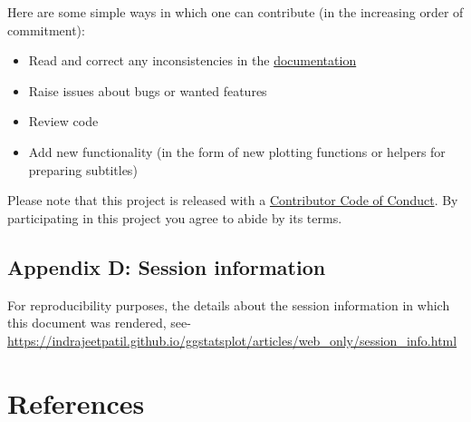\documentclass[
]{article}
\begin{document}
Here are some simple ways in which one can contribute (in the increasing order
of commitment):

\begin{itemize}
\item
  Read and correct any inconsistencies in the
  \href{https://indrajeetpatil.github.io/ggstatsplot/}{documentation}
\item
  Raise issues about bugs or wanted features
\item
  Review code
\item
  Add new functionality (in the form of new plotting functions or helpers for
  preparing subtitles)
\end{itemize}

Please note that this project is released with a
\href{https://github.com/IndrajeetPatil/ggstatsplot/blob/master/CODE_OF_CONDUCT.md}{Contributor Code of Conduct}. By participating in this project you agree to abide by its terms.

\hypertarget{appendix-d-session-information}{%
\subsection{Appendix D: Session information}\label{appendix-d-session-information}}

For reproducibility purposes, the details about the session information in which
this document was rendered, see-
\url{https://indrajeetpatil.github.io/ggstatsplot/articles/web_only/session_info.html}

\newpage

\hypertarget{references}{%
\section*{References}\label{references}}
\end{document}
